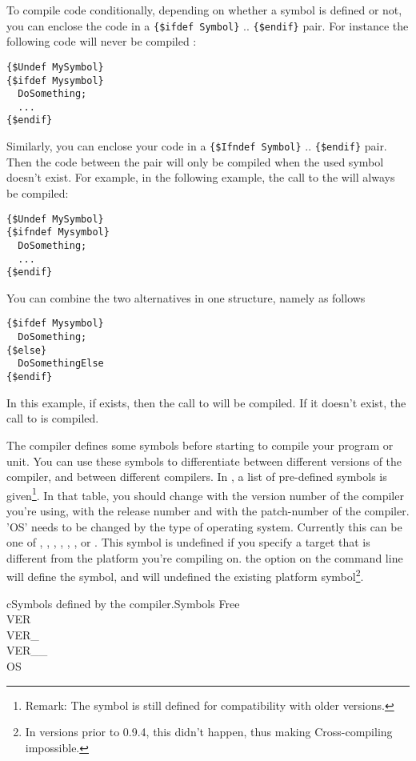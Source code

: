 \documentclass{report}
\begin{document}
To compile code conditionally, depending on whether a symbol is defined or
not, you can enclose the code in a \verb|{$ifdef Symbol}| .. \verb|{$endif}|
pair. For instance the following code will never be compiled :
\begin{verbatim}
{$Undef MySymbol}
{$ifdef Mysymbol}
  DoSomething;
  ...
{$endif}
\end{verbatim}

Similarly, you can enclose your code in a \verb|{$Ifndef Symbol}| .. \verb|{$endif}|
pair. Then the code between the pair will only be compiled when the used
symbol doesn't exist. For example, in the following example, the call to the
 will always be compiled:
\begin{verbatim}
{$Undef MySymbol}
{$ifndef Mysymbol}
  DoSomething;
  ...
{$endif}
\end{verbatim}

You can combine the two alternatives in one structure, namely as follows
\begin{verbatim}
{$ifdef Mysymbol}
  DoSomething;
{$else}
  DoSomethingElse
{$endif}
\end{verbatim}
In this example, if  exists, then the call to 
will be compiled. If it doesn't exist, the call to  is
compiled.

The \fpc compiler defines some symbols before starting to compile your
program or unit. You can use these symbols to differentiate between
different versions of the compiler, and between different compilers.
In , a list of pre-defined symbols is given\footnote{Remark:
The  symbol is still defined for compatibility with older versions.}. In that table,
you should change  with the version number of the compiler
you're using,  with the release number and 
with the patch-number of the compiler. 'OS' needs to be changed by the type
of operating system. Currently this can be one of , ,
, , , ,  or . This symbol is undefined if you
specify a target that is different from the platform you're compiling on.
the  option on the command line will define the  symbol,
and will undefined the existing platform symbol\footnote{In versions prior to
0.9.4, this didn't happen, thus making Cross-compiling impossible.}.

\begin{FPCltable}{c}{Symbols defined by the compiler.}{Symbols} \hline
Free \\
VER \\
VER\_ \\
VER\_\_ \\
OS \\ \hline
\end{FPCltable}
\end{document}
